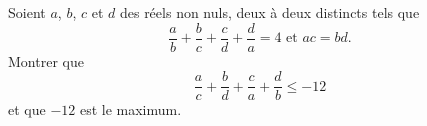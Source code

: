\documentclass[varwidth]{standalone}
\begin{document}
    Soient $a$, $b$, $c$ et $d$ des r\'eels non nuls, deux \`a deux distincts tels que
    \[
        \frac{a}{b} + \frac{b}{c} + \frac{c}{d} + \frac{d}{a} = 4 \text{ et } ac = bd.  
    \]
    Montrer que
    \[
        \frac{a}{c} + \frac{b}{d} + \frac{c}{a} + \frac{d}{b} \leq -12  
    \]
    et que $-12$ est le maximum.
\end{document}

